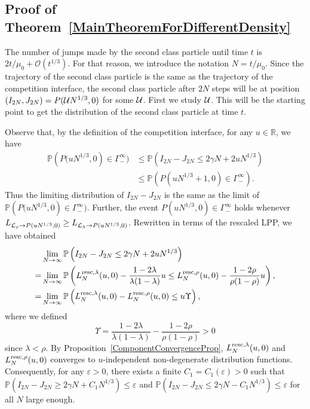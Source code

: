 \documentclass[12pt,a4paper]{article}
\numberwithin{equation}{section}
\newcommand{\Or}{\mathcal{O}}
\newcommand{\Pb}{\mathbb{P}}
\newcommand{\e}{\varepsilon}
\newcommand{\R}{\mathbb{R}}
\begin{document}
 \subsection{Proof of Theorem~\ref{MainTheoremForDifferentDensity}}\label{SectProofMainResult}
The number of jumps made by the second class particle until time $t$ is \mbox{$2t/\mu_0+\Or(t^{1/3})$}. For that reason, we introduce the notation $N=t/\mu_0$. Since the trajectory of the second class particle is the same as the trajectory of the competition interface, the second class particle after $2N$ steps will be at position $(I_{2N},J_{2N})=P({\cal U}N^{1/3},0)$ for some ${\cal U}$. First we study ${\cal U}$. This will be the starting point to get the distribution of the second class particle at time $t$.

Observe that, by the definition of the competition interface, for any $u\in \R$, we have
 \begin{equation}
 \begin{aligned}\label{eq:CompetitionProperty}
 \Pb\left(P(uN^{1/3},0\right)\in \Gamma^{\infty}_{-})&\leq \Pb\left(I_{2N}-J_{2N}\leq 2\gamma N +2 u N^{1/3}\right)\\ & \leq \Pb\left(P(uN^{1/3}+1,0)\in \Gamma^{\infty}_{-}\right).
 \end{aligned}
 \end{equation}
Thus the limiting distribution of $I_{2N}-J_{2N}$ is the same as the limit of $\Pb\left(P(uN^{1/3},0\right)\in \Gamma^{\infty}_{-})$. Further, the event $P(uN^{1/3},0)\in \Gamma^{\infty}_{-}$ holds whenever $L_{{\cal L}_{\rho}\to P(uN^{1/3},0)}\geq L_{{\cal L}_{\lambda}\to P(uN^{1/3},0)}$. Rewritten in terms of the rescaled LPP, we have obtained
\begin{equation}
\begin{aligned}
&\lim_{N\to\infty}\Pb\left(I_{2N}-J_{2N}\leq 2\gamma N +2 u N^{1/3}\right) \\
=& \lim_{N\to\infty} \Pb\left(L_N^{{\rm resc},\lambda}(u,0)-\frac{1-2\lambda}{\lambda(1-\lambda)}u\leq L_N^{{\rm resc},\rho}(u,0)-\frac{1-2\rho}{\rho(1-\rho)}u\right),\\
=&\lim_{N\to\infty} \Pb\left(L_N^{{\rm resc},\lambda}(u,0)-L_N^{{\rm resc},\rho}(u,0)\leq u \Upsilon\right),
\end{aligned}
\end{equation}
where we defined
\begin{equation}
\Upsilon=\frac{1-2\lambda}{\lambda(1-\lambda)} - \frac{1-2\rho}{\rho(1-\rho)}>0
\end{equation}
since $\lambda<\rho$.
By Proposition~\ref{ComponentConvergenceProp}, $L_N^{{\rm resc},\lambda}(u,0)$ and $L_N^{{\rm resc},\rho}(u,0)$ converges to $u$-independent non-degenerate distribution functions. Consequently, for any $\e>0$, there exists a finite $C_1=C_1(\e)>0$ such that $\Pb\left(I_{2N}-J_{2N}\geq 2\gamma N +C_1 N^{1/3}\right)\leq \e$ and $\Pb\left(I_{2N}-J_{2N}\leq 2\gamma N -C_1 N^{1/3}\right)\leq \e$ for all $N$ large enough.
\end{document}
